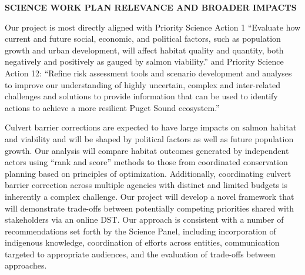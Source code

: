 \begin{center} \textbf{SCIENCE WORK PLAN RELEVANCE AND BROADER IMPACTS} \end{center}



Our project is most directly aligned with Priority Science Action 1 ``Evaluate how current and future social, economic, and political factors, such as population growth and urban development, will affect habitat quality and quantity, both negatively and positively as gauged by salmon viability.'' and Priority Science Action 12: ``Refine risk assessment tools and scenario development and analyses to improve our understanding of highly uncertain, complex and inter-related challenges and solutions to provide information that can be used to identify actions to achieve a more resilient Puget Sound ecosystem.'' 

Culvert barrier corrections are expected to have large impacts on salmon habitat and viability and will be shaped by political factors as well as future population growth. Our analysis will compare habitat outcomes generated by independent actors using ``rank and score'' methods to those from coordinated conservation planning based on principles of optimization. Additionally, coordinating culvert barrier correction across multiple agencies with distinct and limited budgets is inherently a complex challenge. Our project will develop a novel framework that will demonstrate trade-offs between potentially competing priorities shared with stakeholders via an online DST. Our approach is consistent with a number of recommendations set forth by the Science Panel, including incorporation of indigenous knowledge, coordination of efforts across entities, communication targeted to appropriate audiences, and the evaluation of trade-offs between approaches.